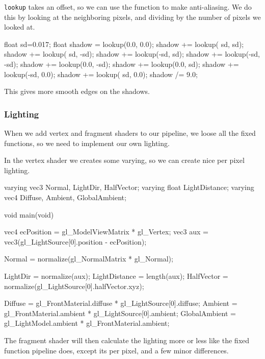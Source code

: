 \texttt{lookup} takes an offset, so we can use the function to make
anti-aliasing. We do this by looking at the neighboring pixels, and
dividing by the number of pixels we looked at.

\begin{cppcode}
    float sd=0.017;
    float shadow = lookup(0.0, 0.0);
    shadow += lookup( sd,  sd);
    shadow += lookup( sd, -sd);
    shadow += lookup(-sd,  sd);
    shadow += lookup(-sd, -sd);
    shadow += lookup(0.0, -sd);
    shadow += lookup(0.0,  sd);
    shadow += lookup(-sd, 0.0);
    shadow += lookup( sd, 0.0);
    shadow /= 9.0;
\end{cppcode}

This gives more smooth edges on the shadows.

\subsubsection*{Lighting}

When we add vertex and fragment shaders to our pipeline, we loose all
the fixed functions, so we need to implement our own lighting. 

In the vertex shader we creates some varying, so we can create nice
per pixel lighting.

\begin{cppcode}
varying vec3 Normal, LightDir, HalfVector;
varying float LightDistance;
varying vec4 Diffuse, Ambient, GlobalAmbient;

void main(void) {
    vec4 ecPosition = gl_ModelViewMatrix * gl_Vertex;
    vec3 aux = vec3(gl_LightSource[0].position - ecPosition);

    Normal = normalize(gl_NormalMatrix * gl_Normal);
    
    LightDir = normalize(aux);
    LightDistance = length(aux);
    HalfVector = normalize(gl_LightSource[0].halfVector.xyz);
    
    Diffuse = gl_FrontMaterial.diffuse * gl_LightSource[0].diffuse;
    Ambient = gl_FrontMaterial.ambient * gl_LightSource[0].ambient;
    GlobalAmbient = gl_LightModel.ambient * gl_FrontMaterial.ambient;
}
\end{cppcode}

The fragment shader will then calculate the lighting more or less like
the fixed function pipeline does, except its per pixel, and a few
minor differences.

